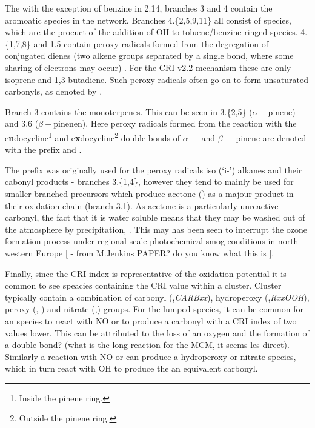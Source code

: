 The with the exception of benzine in 2.14, branches 3 and 4 contain the aromoatic species in the network.  Branches 4.\{2,5,9,11\} all consist of \emph{} species, which are the procuct of the addition of OH to toluene/benzine ringed species. 4.\{1,7,8\} and 1.5 contain peroxy radicals formed from the degregation of conjugated dienes (two alkene groups separated by a single bond, where some sharing of electrons may occur) \emph{}. For the CRI v2.2 mechanism these are only isoprene and 1,3-butadiene. Such peroxy radicals often go on to form unsaturated carbonyls, as denoted by \emph{}.

Branch 3 contains the monoterpenes. This can be seen in 3.\{2,5\} ($\alpha-$pinene) and 3.6 ($\beta-$pinenen). Here peroxy radicals formed from the reaction with the e\textbf{n}docyclinc\footnote{Inside the pinene ring.} and e\textbf{x}docyclinc\footnote{Outside the pinene ring.} double bonds of $\alpha-$ and $\beta-$ pinene are denoted with the prefix \emph{} and \emph{}.

The \emph{} prefix was originally used for the peroxy radicals iso (`i-') alkanes and their cabonyl products - branches 3.\{1,4\}, however they tend to mainly be used for smaller branched precursors which produce acetone () as a majour product in their oxidation chain (branch 3.1). As acetone is a particularly unreactive carbonyl, the fact that it is water soluble means that they may be washed out of the atmosphere by precipitation, \citep{acetonerain}. This may has been seen to interrupt the ozone formation process under regional-scale photochemical smog conditions in north-western Europe [ - from M.Jenkins PAPER? do you know what this is ].


Finally, since the CRI index is representative of the oxidation potential it is common to see speacies containing the CRI value within a cluster. Cluster typically contain a combination of carbonyl (,\emph{CARBxx}), hydroperoxy (,\emph{RxxOOH}), peroxy (, \emph{}) and nitrate (,\emph{}) groups. For the lumped species, it can be common for an  species to react with NO or  to produce a carbonyl with a CRI index of two values lower. This can be attributed to the loss of an oxygen and the formation of a double bond? (what is the long reaction for the MCM, it seems les direct). Similarly a reaction with NO or  can produce a hydroperoxy or nitrate species, which in turn react with OH to produce the an equivalent carbonyl.


